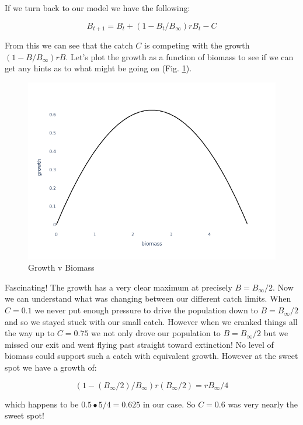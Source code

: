 \documentclass[11pt,a5paper]{book}
\begin{document}
If we turn back to our model we have the following:

$$B_{t+1} = B_t + (1 - B_t/B_\infty)rB_t - C$$

From this we can see that the catch $C$ is competing with the growth $(1 - B/B_\infty)rB$. Let's plot the growth as a function of biomass to see if we can get any hints as to what might be going on (Fig. \ref{fig:growth_v_biomass}).
\newline

\begin{figure}[h!] 
  \includegraphics[width=\linewidth]{notebooks/SurplusModels/surplus_yield.png}
  \caption{Growth v Biomass}
  \label{fig:growth_v_biomass}
\end{figure}

Fascinating! The growth has a very clear maximum at precisely $B=B_\infty / 2$. Now we can understand what was changing between our different catch limits. When $C=0.1$ we never put enough pressure to drive the population down to $B=B_\infty / 2$ and so we stayed stuck with our small catch. However when we cranked things all the way up to $C=0.75$ we not only drove our population to $B=B_\infty / 2$ but we missed our exit and went flying past straight toward extinction! No level of biomass could support such a catch with equivalent growth. However at the sweet spot we have a growth of:

$$(1-(B_\infty/2) / B_\infty)r(B_\infty /2) = rB_\infty / 4$$

which happens to be $0.5 \bullet 5 / 4 = 0.625$ in our case. So $C=0.6$ was very nearly the sweet spot!
\newline
\end{document}
